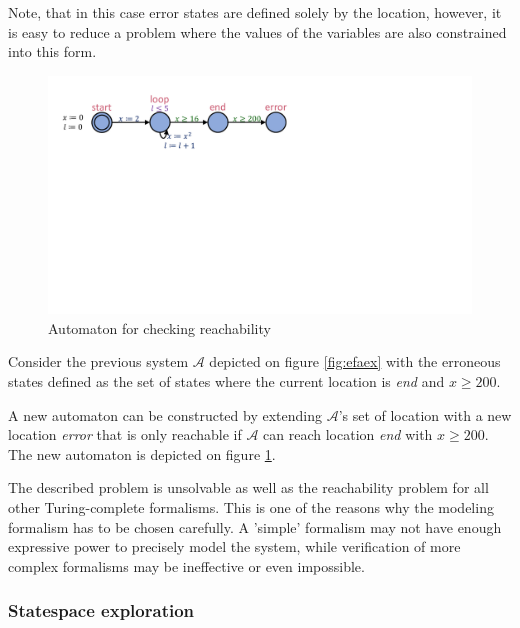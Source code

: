 Note, that in this case error states are defined solely by the location, however, it is easy to reduce a problem where the values of the variables are also constrained into this form.

\begin{figure}
	\centering
	\begin{minipage}{0.7\textwidth}
		\includegraphics[width=\textwidth]{include/figures/loop_example_error}%
		\caption{Automaton for checking reachability}
		\label{fig:efaexerr}
	\end{minipage}
\end{figure}

\begin{example}
	Consider the previous system $\mathcal{A}$ depicted on figure \ref{fig:efaex} with the erroneous states defined as the set of states where the current location is \emph{end} and $x \geq 200$.
	
	A new automaton can be constructed by extending $\mathcal{A}$'s set of location with a new location \emph{error} that is only reachable if $\mathcal{A}$ can reach location \emph{end} with $x \geq 200$. The new automaton is depicted on figure \ref{fig:efaexerr}.
\end{example}

The described problem is unsolvable as well as the reachability problem for all other Turing-complete formalisms. This is one of the reasons why the modeling formalism has to be chosen carefully. A 'simple' formalism may not have enough expressive power to precisely model the system, while verification of more complex formalisms may be ineffective or even impossible.

\subsubsection{Statespace exploration}

